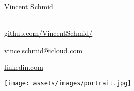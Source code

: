 \vspace{0pt}
\begin{minipage}[t]{0.6\textwidth}
    \vspace{0pt}
    {\sectionfont\fontsize{20}{30}\selectfont\color{black}
        Vincent Schmid\\[0.2em]
    }
    {\sectionfont\fontsize{13}{14}\selectfont\color{altColor}
        \\[0.6em]
    }
    \begin{minipage}[t]{0.58\linewidth}
        \begin{description}[labelwidth=1em]
            \item[\faGithub\color{altColor}] \href{https://github.com/VincentSchmid/}{github.com/VincentSchmid/}
            \item[\faEnvelopeO\color{altColor}] vince.schmid@icloud.com
        \end{description}
        \vspace{.5em}
    \end{minipage}
    \hfill
    \begin{minipage}[t]{0.38\linewidth}
        \begin{description}[labelwidth=1em]
            \item[\faLinkedin\color{altColor}] \href{https://www.linkedin.com/in/vincent-schmid-b931787a/}{linkedin.com}

        \end{description}
    \end{minipage}
\end{minipage}
\hfill
\begin{minipage}[t]{0.38\textwidth}
    \vspace{0pt}
    \hfill\texttt{[image: assets/images/portrait.jpg]}
    \vspace{1em}
\end{minipage}
